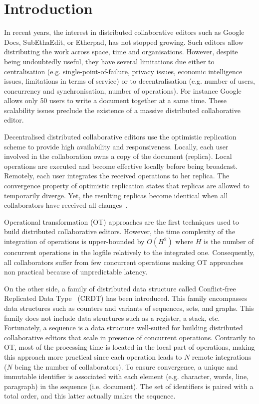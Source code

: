 
\section{Introduction}

In recent years, the interest in distributed collaborative editors such as
Google Docs, SubEthaEdit, or Etherpad, has not stopped growing. Such editors
allow distributing the work across space, time and organisations. However,
despite being undoubtedly useful, they have several limitations due either to
centralisation (e.g. single-point-of-failure, privacy issues, economic
intelligence issues, limitations in terms of service) or to decentralisation
(e.g. number of users, concurrency and synchronisation, number of
operations). For instance Google~\cite{nichols1995high} allows only 50 users to
write a document together at a same time. These scalability issues preclude the
existence of a massive distributed collaborative editor.

Decentralised distributed collaborative editors use the optimistic replication
scheme \cite{johnson1975maintenance, saito2005optimistic} to provide high
availability and responsiveness. Locally, each user involved in the
collaboration owns a copy of the document (replica). Local operations are
executed and become effective locally before being broadcast. Remotely, each
user integrates the received operations to her replica. The convergence
property of optimistic replication states that replicas are allowed to
temporarily diverge. Yet, the resulting replicas become identical when all
collaborators have received all changes~\cite{demers1987epidemic}.

Operational transformation (OT) approaches are the first techniques used to
build distributed collaborative editors. However, the time complexity of the
integration of operations is upper-bounded by $O(H^2)$ where $H$ is the number
of concurrent operations in the logfile relatively to the integrated
one. Consequently, all collaborators suffer from few concurrent operations
making OT approaches non practical because of unpredictable latency.

On the other side, a family of distributed data structure called Conflict-free
Replicated Data Type~\cite{shapiro2011comprehensive, shapiro2011conflict} (CRDT)
has been introduced. This family encompasses data structures such as counters
and variants of sequences, sets, and graphs. This family does not include data
structures such as a register, a stack, etc. Fortunately, a sequence is a data
structure well-suited for building distributed collaborative editors that scale
in presence of concurrent operations. Contrarily to OT, most of the processing
time is located in the local part of operations, making this approach more
practical since each operation leads to $N$ remote integrations ($N$ being the
number of collaborators). To ensure convergence, a unique and immutable
identifier is associated with each element (e.g. character, words, line,
paragraph) in the sequence (i.e. document). The set of identifiers is paired
with a total order, and this latter actually makes the sequence.

